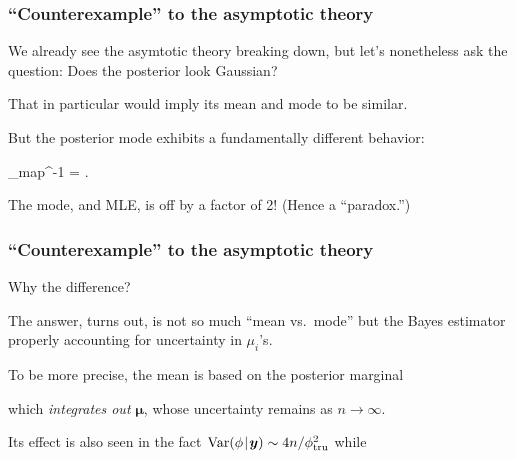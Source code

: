 \documentclass[18pt]{beamer}
\newcommand{\defineTightItemizeSpacing}{%
	\setlength{\abovedisplayskip}{.25\baselineskip}%
	\setlength{\belowdisplayskip}{.25\baselineskip}%
}
\newenvironment{tightEquation*}{%
	\defineTightItemizeSpacing%
	\begin{equation*}
}{
	\end{equation*} \ignorespacesafterend
}
\newcommand{\given}{\thinnerspace | \thinnerspace}
\newcommand{\diff}{\operatorname{\mathrm{d}}\!{}}
\newcommand{\thinnerspace}{\mskip.5\thinmuskip}
\newcommand{\variance}{\mathrm{Var}}
\newcommand{\map}[1]{\widehat{#1}_{\textrm{map}}}
\newcommand{\truthSub}{\mathrm{tru}}
\newcommand{\density}{\pi}
\newcommand{\likelihood}{L}
\newcommand{\by}{\bm{y}}
\newcommand{\bmu}{\bm{\mu}}
\newcommand{\Id}{\bm{I}}
\begin{document}
\begin{frame}
\frametitle{``Counterexample'' to the asymptotic theory}
We already see the asymtotic theory breaking down, but let's nonetheless ask the question: Does the posterior look Gaussian?

\pause%
\smallskip
That in particular would imply its mean and mode to be similar.

\pause%
\smallskip
But the posterior mode exhibits a fundamentally different behavior:
\begin{tightEquation*}
\map{\phi}^{-1} = .
\end{tightEquation*}

\pause%
The mode, and {\small MLE}, is off by a factor of 2! (Hence a ``paradox.'')
\end{frame}


\begin{frame}
\frametitle{``Counterexample'' to the asymptotic theory}
Why the difference? 

\pause%
The answer, turns out, is not so much ``mean vs.\ mode'' but the Bayes estimator properly accounting for uncertainty in $\mu_i$'s. 

\pause%
\smallskip
To be more precise, the mean is based on the posterior marginal
\begin{tightEquation*}
\density(\phi \given \by)
	= \int \density(\phi \given \bmu, \by) \thinnerspace \density(\bmu \given \by) \diff \bmu
\end{tightEquation*}
which \textit{integrates out} $\bmu$, whose uncertainty remains as $n \to \infty$.

\pause%
\smallskip
Its effect is also seen in the fact $\thinnerspace \variance(\phi \given \by) \sim 4 n / \phi_\truthSub^2$ while 
\end{frame}
\end{document}
